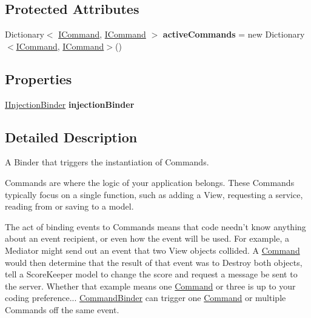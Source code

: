 \subsection*{Protected Attributes}
\begin{DoxyCompactItemize}
\item 
\hypertarget{classstrange_1_1extensions_1_1command_1_1impl_1_1_command_binder_afecf5c141c75658b7326efe1b34ff382}{Dictionary$<$ \hyperlink{interfacestrange_1_1extensions_1_1command_1_1api_1_1_i_command}{I\-Command}, \hyperlink{interfacestrange_1_1extensions_1_1command_1_1api_1_1_i_command}{I\-Command} $>$ {\bfseries active\-Commands} = new Dictionary$<$\hyperlink{interfacestrange_1_1extensions_1_1command_1_1api_1_1_i_command}{I\-Command}, \hyperlink{interfacestrange_1_1extensions_1_1command_1_1api_1_1_i_command}{I\-Command}$>$()}\label{classstrange_1_1extensions_1_1command_1_1impl_1_1_command_binder_afecf5c141c75658b7326efe1b34ff382}

\end{DoxyCompactItemize}
\subsection*{Properties}
\begin{DoxyCompactItemize}
\item 
\hypertarget{classstrange_1_1extensions_1_1command_1_1impl_1_1_command_binder_a011d8c52fdd8fdfffbc3d61089d3ff19}{\hyperlink{interfacestrange_1_1extensions_1_1injector_1_1api_1_1_i_injection_binder}{I\-Injection\-Binder} {\bfseries injection\-Binder}}\label{classstrange_1_1extensions_1_1command_1_1impl_1_1_command_binder_a011d8c52fdd8fdfffbc3d61089d3ff19}

\end{DoxyCompactItemize}


\subsection{Detailed Description}
A Binder that triggers the instantiation of Commands. 

Commands are where the logic of your application belongs. These Commands typically focus on a single function, such as adding a View, requesting a service, reading from or saving to a model.

The act of binding events to Commands means that code needn't know anything about an event recipient, or even how the event will be used. For example, a Mediator might send out an event that two View objects collided. A \hyperlink{classstrange_1_1extensions_1_1command_1_1impl_1_1_command}{Command} would then determine that the result of that event was to Destroy both objects, tell a Score\-Keeper model to change the score and request a message be sent to the server. Whether that example means one \hyperlink{classstrange_1_1extensions_1_1command_1_1impl_1_1_command}{Command} or three is up to your coding preference... \hyperlink{classstrange_1_1extensions_1_1command_1_1impl_1_1_command_binder}{Command\-Binder} can trigger one \hyperlink{classstrange_1_1extensions_1_1command_1_1impl_1_1_command}{Command} or multiple Commands off the same event.

